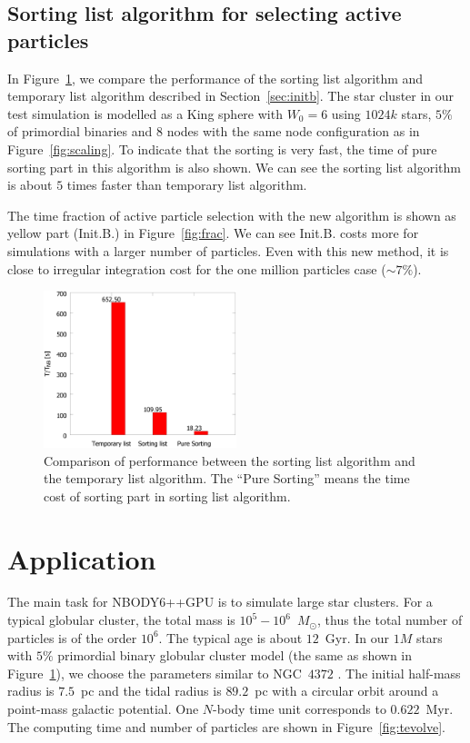 \documentclass[usenatbib,aas_macros]{mn2e}
\def\nbodyppgpu{NBODY6++GPU }
\def\nb{$N$-body }
\begin{document}
\subsection{Sorting list algorithm for selecting active particles}

In Figure~\ref{fig:initblock}, we compare the performance of the sorting list algorithm and temporary list algorithm described in Section~\ref{sec:initb}.
The star cluster in our test simulation is modelled as a King sphere \citep{King1966} with $W_0 = 6$ using $1024k$ stars,  $5\%$ of primordial binaries and $8$ nodes with the same node configuration as in Figure~\ref{fig:scaling}.
To indicate that the sorting is very fast, the time of pure sorting part in this algorithm is also shown. 
We can see the sorting list algorithm is about $5$ times faster than temporary list algorithm.

The time fraction of active particle selection with the new algorithm is shown as yellow part (Init.B.) in Figure~\ref{fig:frac}. We can see Init.B. costs more for simulations with a larger number of particles. Even with this new method, it is close to irregular integration cost for the one million particles case ($\sim7\%$).

\begin{figure}
  \centering
  \includegraphics[width=0.5\textwidth,height=!]{tiblock.eps}
  \caption{Comparison of performance between the sorting list algorithm and the temporary list algorithm. 
    The ``Pure Sorting'' means the time cost of sorting part in sorting list algorithm. }
  \label{fig:initblock}
\end{figure}

\section{Application}
\label{sec:app}
The main task for \nbodyppgpu is to simulate large star clusters. 
For a typical globular cluster, the total mass is $10^5-10^6$~$M_\odot$, thus the total number of particles is of the order $10^6$. 
The typical age is about $12$~Gyr. 
In our $1M$ stars with $5\%$ primordial binary globular cluster model (the same as shown in Figure~\ref{fig:initblock}), we choose the parameters similar to NGC~$4372$ \citep{Harris1996}. 
The initial half-mass radius is $7.5$~pc and the tidal radius is $89.2$~pc with a circular orbit around a point-mass galactic potential. 
One \nb time unit corresponds to $0.622$~Myr. 
The computing time and number of particles are shown in Figure~\ref{fig:tevolve}. 
\end{document}

